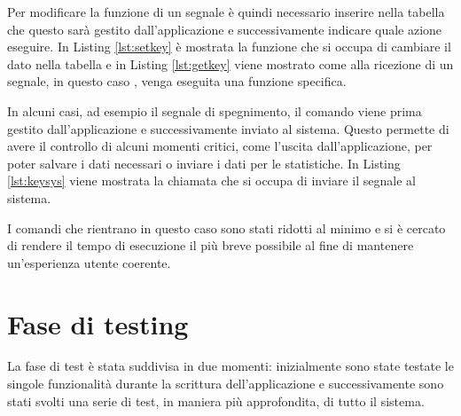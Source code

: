Per modificare la funzione di un segnale è quindi necessario inserire nella tabella che questo sarà gestito dall'applicazione e successivamente indicare quale azione eseguire. In Listing \ref*{lst:setkey} è mostrata la funzione che si occupa di cambiare il dato nella tabella e in Listing \ref*{lst:getkey} viene mostrato come alla ricezione di un segnale, in questo caso , venga eseguita una funzione specifica.




In alcuni casi, ad esempio il segnale di spegnimento, il comando viene prima gestito dall'applicazione e successivamente inviato al sistema. Questo permette di avere il controllo di alcuni momenti critici, come l'uscita dall'applicazione, per poter salvare i dati necessari o inviare i dati per le statistiche.
In Listing \ref*{lst:keysys} viene mostrata la chiamata che si occupa di inviare il segnale al sistema.



I comandi che rientrano in questo caso sono stati ridotti al minimo e si è cercato di rendere il tempo di esecuzione il più breve possibile al fine di mantenere un'esperienza utente coerente.

\section{Fase di testing}

La fase di test è stata suddivisa in due momenti: inizialmente sono state testate le singole funzionalità durante la scrittura dell'applicazione e successivamente sono stati svolti una serie di test, in maniera più approfondita, di tutto il sistema.

